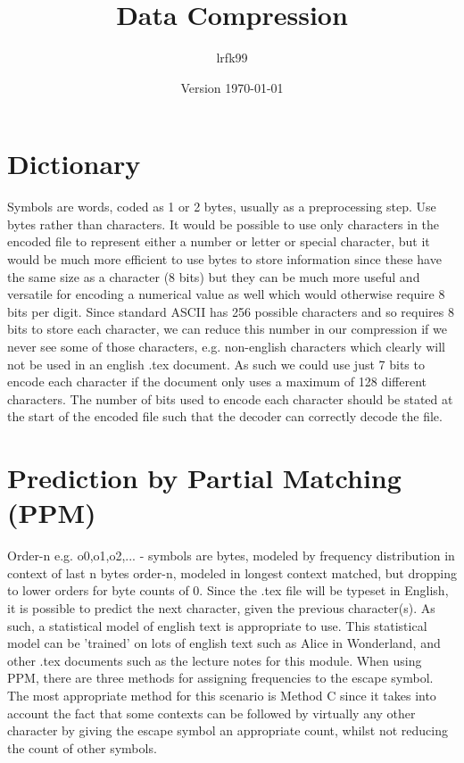 \documentclass[a4paper, 11pt]{article}
\title{Data Compression}
\date{Version \today}
\author{lrfk99}
\numberwithin{equation}{section}
\theoremstyle{plain}
\theoremstyle{definition}
\begin{document}
\maketitle


\section{Dictionary}
Symbols are words, coded as 1 or 2 bytes, usually as a preprocessing step.
Use bytes rather than characters.
It would be possible to use only characters in the encoded file to represent either a number or letter or special character, 
but it would be much more efficient to use bytes to store information since these have the same size as a character (8 bits) 
but they can be much more useful and versatile for encoding a numerical value as well which would otherwise require 8 bits per 
digit.
Since standard ASCII has 256 possible characters and so requires 8 bits to store each character, 
we can reduce this number in our compression if we never see some of those characters, e.g. non-english characters which 
clearly will not be used in an english .tex document. As such we could use just 7 bits to encode each character if the document
only uses a maximum of 128 different characters. The number of bits used to encode each character should be stated at the 
start of the encoded file such that the decoder can correctly decode the file.

\section{Prediction by Partial Matching (PPM)}
Order-n e.g. o0,o1,o2,... - symbols are bytes, modeled by frequency distribution in context of last n bytes
order-n, modeled in longest context matched, but dropping to lower orders for byte counts of 0.
Since the .tex file will be typeset in English, it is possible to predict the next character, 
given the previous character(s). As such, a statistical model of english text is appropriate to use. 
This statistical model can be 'trained' on lots of english text such as Alice in Wonderland, 
and other .tex documents such as the lecture notes for this module. 
When using PPM, there are three methods for assigning frequencies to the escape symbol. 
The most appropriate method for this scenario is Method C since it takes into account the fact that 
some contexts can be followed by virtually any other character by giving the escape symbol 
an appropriate count, whilst not reducing the count of other symbols.
\end{document}
